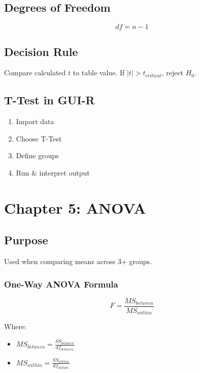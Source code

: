 \documentclass[
  letterpaper,
  DIV=11,
  numbers=noendperiod]{scrreprt}
\providecommand{\tightlist}{%
  \setlength{\itemsep}{0pt}\setlength{\parskip}{0pt}}
\begin{document}
\subsection{Degrees of Freedom}\label{degrees-of-freedom}

\[
df = n - 1
\]

\subsection{Decision Rule}\label{decision-rule}

Compare calculated \(t\) to table value. If \(|t| > t_{critical}\),
reject \(H_0\).

\subsection{T-Test in GUI-R}\label{t-test-in-gui-r}

\begin{enumerate}
\def\labelenumi{\arabic{enumi}.}
\tightlist
\item
  Import data\\
\item
  Choose T-Test\\
\item
  Define groups\\
\item
  Run \& interpret output
\end{enumerate}

\section{Chapter 5: ANOVA}\label{chapter-5-anova}

\subsection{Purpose}\label{purpose-1}

Used when comparing means across 3+ groups.

\subsubsection{One-Way ANOVA Formula}\label{one-way-anova-formula}

\[
F = \frac{MS_{between}}{MS_{within}}
\]

Where:

\begin{itemize}
\tightlist
\item
  \(MS_{between} = \frac{SS_{between}}{df_{between}}\)\\
\item
  \(MS_{within} = \frac{SS_{within}}{df_{within}}\)
\end{itemize}
\end{document}
